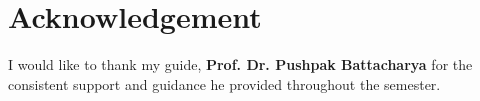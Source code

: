 \documentclass[12pt,a4paper]{report}
\def\baselinestretch{1.5}
\begin{document}
\def\title{SubModular Functions \& Text Summarizations}
\def\what{CS 691 \\ R\&D Project Report}
\def\who{Jayaprakash S}
\def\roll{123050045}
\def\guide{Prof. Dr. Pushpak Battacharya}
\titlpage
\newpage
\newpage

\section*{Acknowledgement}

I would like to thank my guide, \textbf{Prof. Dr. Pushpak Battacharya} for the consistent support and guidance he provided throughout the semester. 


\newpage


\newpage
\listoffigures

\newpage


\def\bsq{\begin{flushright} $\blacksquare$\\ \end{flushright}}
\def\tab{\hspace{5mm}}

\begingroup{}\def\baselinestretch{1.5}\tableofcontents\endgroup     

\newpage
{}




\renewcommand\bibname{References}


\nocite{*}
\end{document}

